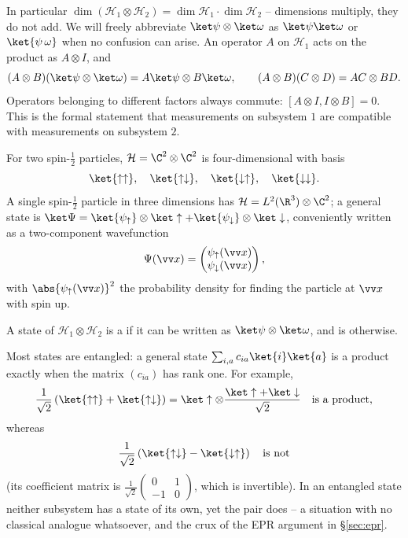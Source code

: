 In particular $\dim(\mathcal{H}_1\otimes\mathcal{H}_2) = \dim\mathcal{H}_1 \cdot \dim\mathcal{H}_2$ -- dimensions multiply, they do not add. We will freely abbreviate $\ket\psi\otimes\ket\omega$ as $\ket\psi\ket\omega$ or $\ket{\psi\,\omega}$ when no confusion can arise. An operator $A$ on $\mathcal{H}_1$ acts on the product as $A \otimes I$, and
$$
(A\otimes B)(\ket\psi\otimes\ket\omega) = A\ket\psi\otimes B\ket\omega, \qquad (A\otimes B)(C \otimes D) = AC \otimes BD.
$$
Operators belonging to different factors always commute: $[A\otimes I, I \otimes B] = 0$. This is the formal statement that measurements on subsystem $1$ are compatible with measurements on subsystem $2$.

\begin{example}
    For two spin-$\frac12$ particles, $\mathcal{H} = \C^2\otimes\C^2$ is four-dimensional with basis
    $$
    \ket{\uparrow\uparrow}, \quad \ket{\uparrow\downarrow}, \quad \ket{\downarrow\uparrow}, \quad \ket{\downarrow\downarrow}.
    $$
    A single spin-$\frac12$ particle in three dimensions has $\mathcal{H} = L^2(\R^3)\otimes\C^2$; a general state is $\ket\Psi = \ket{\psi_\uparrow}\otimes\ket\uparrow + \ket{\psi_\downarrow}\otimes\ket\downarrow$, conveniently written as a two-component  wavefunction
    $$
    \Psi(\vv x) = \begin{pmatrix} \psi_\uparrow(\vv x) \\ \psi_\downarrow(\vv x) \end{pmatrix},
    $$
    with $\abs{\psi_\uparrow(\vv x)}^2$ the probability density for finding the particle at $\vv x$ with spin up.
\end{example}

\begin{definition}[Entanglement]
    A state of $\mathcal{H}_1\otimes\mathcal{H}_2$ is a  if it can be written as $\ket\psi\otimes\ket\omega$, and is  otherwise.
\end{definition}

Most states are entangled: a general state $\sum_{i,a}c_{ia}\ket{i}\ket{a}$ is a product exactly when the matrix $(c_{ia})$ has rank one. For example,
$$
\frac{1}{\sqrt2}\left( \ket{\uparrow\uparrow} + \ket{\uparrow\downarrow} \right) = \ket\uparrow \otimes \frac{\ket\uparrow + \ket\downarrow}{\sqrt2} \quad \text{is a product},
$$
whereas
$$
\frac{1}{\sqrt2}\left( \ket{\uparrow\downarrow} - \ket{\downarrow\uparrow} \right) \quad \text{is not}
$$
(its coefficient matrix is $\frac{1}{\sqrt2}\left(\begin{smallmatrix}0&1\\-1&0\end{smallmatrix}\right)$, which is invertible). In an entangled state neither subsystem has a state of its own, yet the pair does -- a situation with no classical analogue whatsoever, and the crux of the EPR argument in \S\ref{sec:epr}.

